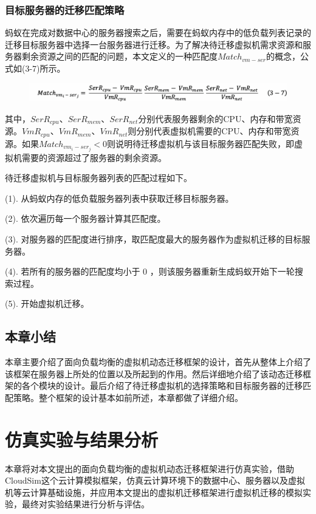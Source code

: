 \subsection{目标服务器的迁移匹配策略}
蚂蚁在完成对数据中心的服务器搜索之后，需要在蚂蚁内存中的低负载列表记录的迁移目标服务器中选择一台服务器进行迁移。为了解决待迁移虚拟机需求资源和服务器剩余资源之间的匹配的问题，本文定义的一种匹配度$ Match_{vm-ser} $的概念，公式如(3-7)所示。

\begin{figure}[!htp]
  \centering
  \includegraphics[width=0.95\linewidth]{./Figure/IMG_Chap3_12.png}
\end{figure}

其中，$ SerR_{cpu} $、$ SerR_{mem} $、$ SerR_{net} $分别代表服务器剩余的CPU、内存和带宽资源。$ VmR_{cpu} $、$ VmR_{mem} $、$ VmR_{net} $则分别代表虚拟机需要的CPU、内存和带宽资源。如果$ Match_{vm_i-ser_j} < 0 $则说明待迁移虚拟机与该目标服务器匹配失败，即虚拟机需要的资源超过了服务器的剩余资源。

待迁移虚拟机与目标服务器列表的匹配过程如下。

    (1). 从蚂蚁内存的低负载服务器列表中获取迁移目标服务器。

    (2). 依次遍历每一个服务器计算其匹配度。

    (3). 对服务器的匹配度进行排序，取匹配度最大的服务器作为虚拟机迁移的目标服务器。

    (4). 若所有的服务器的匹配度均小于 0 ，则该服务器重新生成蚂蚁开始下一轮搜索过程。

    (5). 开始虚拟机迁移。

\section{本章小结}
本章主要介绍了面向负载均衡的虚拟机动态迁移框架的设计，首先从整体上介绍了该框架在服务器上所处的位置以及所起到的作用。然后详细地介绍了该动态迁移框架的各个模块的设计。最后介绍了待迁移虚拟机的选择策略和目标服务器的迁移匹配策略。整个框架的设计基本如前所述，本章都做了详细介绍。

\chapter{仿真实验与结果分析}
本章将对本文提出的面向负载均衡的虚拟机动态迁移框架进行仿真实验，借助CloudSim这个云计算模拟框架，仿真云计算环境下的数据中心、服务器以及虚拟机等云计算基础设施，并应用本文提出的虚拟机迁移框架进行虚拟机迁移的模拟实验，最终对实验结果进行分析与评估。

